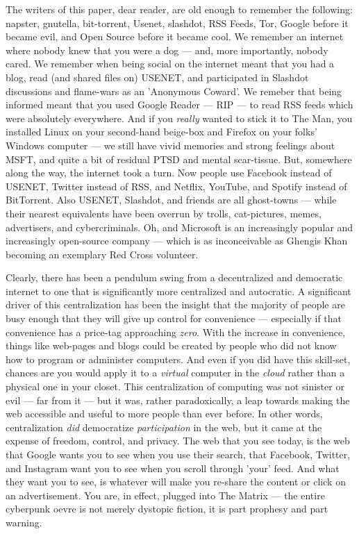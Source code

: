 \documentclass[a4paper]{article}
\begin{document}
The writers of this paper, dear reader, are old enough to remember the following: napster, gnutella, bit-torrent, Usenet, slashdot, RSS Feeds, Tor, Google before it became evil, and Open Source before it became cool. We remember an internet where nobody knew that you were a dog ---  and, more importantly, nobody cared. We remember when being social on the internet meant that you had a blog, read (and shared files on) USENET, and participated in Slashdot discussions and flame-wars as an 'Anonymous Coward'. We remeber that being informed meant that you used Google Reader ---  RIP ---  to read RSS feeds which were absolutely everywhere. And if you \emph{really} wanted to stick it to The Man, you installed Linux on your second-hand beige-box and Firefox on your folks' Windows computer ---  we still have vivid memories and strong feelings about MSFT, and quite a bit of residual PTSD and mental scar-tissue. But, somewhere along the way, the internet took a turn. Now people use Facebook instead of USENET, Twitter instead of RSS, and Netflix, YouTube, and Spotify instead of BitTorrent. Also USENET, Slashdot, and friends are all ghost-towns ---  while their nearest equivalents have been overrun by trolls, cat-pictures, memes, advertisers, and cybercriminals. Oh, and Microsoft is an increasingly popular and increasingly open-source company ---  which is as inconceivable as Ghengis Khan becoming an exemplary Red Cross volunteer.

Clearly, there has been a pendulum swing from a decentralized and democratic internet to one that is significantly more centralized and autocratic. A significant driver of this centralization has been the insight that the majority of people are busy enough that they will give up control for convenience ---  especially if that convenience has a price-tag approaching \emph{zero}. With the increase in convenience, things like web-pages and blogs could be created by people who did not know how to program or administer computers. And even if you did have this skill-set, chances are you would apply it to a \emph{virtual} computer in the \emph{cloud} rather than a physical one in your closet. This centralization of computing was not sinister or evil ---  far from it ---  but it was, rather paradoxically, a leap towards making the web accessible and useful to more people than ever before. In other words, centralization \emph{did} democratize \emph{participation} in the web, but it came at the expense of freedom, control, and privacy. The web that you see today, is the web that Google wants you to see when you use their search, that Facebook, Twitter, and Instagram want you to see when you scroll through 'your' feed. And what they want you to see, is whatever will make you re-share the content or click on an advertisement. You are, in effect, plugged into The Matrix ---  the entire cyberpunk oevre is not merely dystopic fiction, it is part prophesy and part warning.
\end{document}
